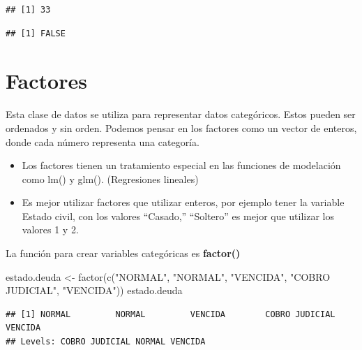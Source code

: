 \documentclass[
  12pt,
]{book}
\newenvironment{Shaded}{\begin{snugshade}}{\end{snugshade}}
\newcommand{\FunctionTok}[1]{\textcolor[rgb]{0.00,0.00,0.00}{#1}}
\newcommand{\NormalTok}[1]{#1}
\newcommand{\OtherTok}[1]{\textcolor[rgb]{0.56,0.35,0.01}{#1}}
\newcommand{\SpecialCharTok}[1]{\textcolor[rgb]{0.00,0.00,0.00}{#1}}
\newcommand{\StringTok}[1]{\textcolor[rgb]{0.31,0.60,0.02}{#1}}
\providecommand{\tightlist}{%
  \setlength{\itemsep}{0pt}\setlength{\parskip}{0pt}}
\begin{document}
\begin{verbatim}
## [1] 33
\end{verbatim}

\begin{Shaded}
\end{Shaded}

\begin{verbatim}
## [1] FALSE
\end{verbatim}

\hypertarget{factores}{%
\section{\texorpdfstring{\textbf{Factores}}{Factores}}\label{factores}}

Esta clase de datos se utiliza para representar datos categóricos. Estos pueden ser ordenados y sin orden. Podemos pensar en los factores como un vector de enteros, donde cada número representa una categoría.

\begin{itemize}
\tightlist
\item
  Los factores tienen un tratamiento especial en las funciones de modelación como lm() y glm(). (Regresiones lineales)
\item
  Es mejor utilizar factores que utilizar enteros, por ejemplo tener la variable Estado civil, con los valores ``Casado,'' ``Soltero'' es mejor que utilizar los valores 1 y 2.
\end{itemize}

La función para crear variables categóricas es \textbf{factor()}

\begin{Shaded}
\begin{Highlighting}[]
\NormalTok{estado.deuda }\OtherTok{\textless{}{-}} \FunctionTok{factor}\NormalTok{(}\FunctionTok{c}\NormalTok{(}\StringTok{"NORMAL"}\NormalTok{, }\StringTok{"NORMAL"}\NormalTok{, }\StringTok{"VENCIDA"}\NormalTok{, }\StringTok{"COBRO JUDICIAL"}\NormalTok{, }\StringTok{"VENCIDA"}\NormalTok{))}
\NormalTok{estado.deuda}
\end{Highlighting}
\end{Shaded}

\begin{verbatim}
## [1] NORMAL         NORMAL         VENCIDA        COBRO JUDICIAL VENCIDA       
## Levels: COBRO JUDICIAL NORMAL VENCIDA
\end{verbatim}
\end{document}
